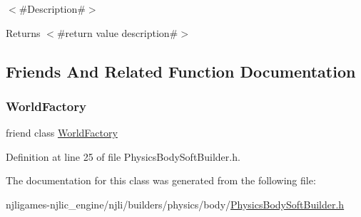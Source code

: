 $<$\#\+Description\#$>$

\begin{DoxyReturn}{Returns}
$<$\#return value description\#$>$ 
\end{DoxyReturn}


\subsection{Friends And Related Function Documentation}
\mbox{\label{classnjli_1_1_physics_body_soft_builder_acb96ebb09abe8f2a37a915a842babfac}} 
\subsubsection{\texorpdfstring{World\+Factory}{WorldFactory}}
{\footnotesize\ttfamily friend class \mbox{\hyperlink{classnjli_1_1_world_factory}{World\+Factory}}\hspace{0.3cm}{\ttfamily [friend]}}



Definition at line 25 of file Physics\+Body\+Soft\+Builder.\+h.



The documentation for this class was generated from the following file\+:\begin{DoxyCompactItemize}
\item 
njligames-\/njlic\+\_\+engine/njli/builders/physics/body/\mbox{\hyperlink{_physics_body_soft_builder_8h}{Physics\+Body\+Soft\+Builder.\+h}}\end{DoxyCompactItemize}
